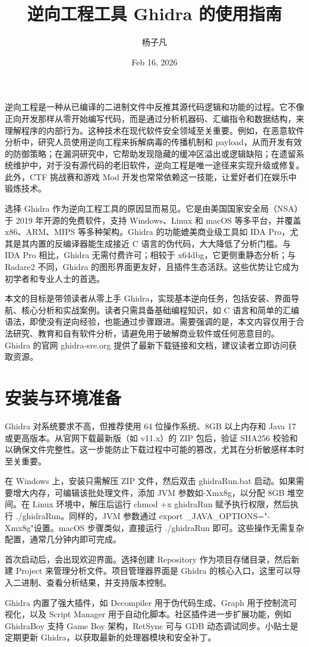 \title{逆向工程工具 Ghidra 的使用指南}
\author{杨子凡}
\date{Feb 16, 2026}
\maketitle
逆向工程是一种从已编译的二进制文件中反推其源代码逻辑和功能的过程。它不像正向开发那样从零开始编写代码，而是通过分析机器码、汇编指令和数据结构，来理解程序的内部行为。这种技术在现代软件安全领域至关重要。例如，在恶意软件分析中，研究人员使用逆向工程来拆解病毒的传播机制和 payload，从而开发有效的防御策略；在漏洞研究中，它帮助发现隐藏的缓冲区溢出或逻辑缺陷；在遗留系统维护中，对于没有源代码的老旧软件，逆向工程是唯一途径来实现升级或修复。此外，CTF 挑战赛和游戏 Mod 开发也常常依赖这一技能，让爱好者们在娱乐中锻炼技术。\par
选择 Ghidra 作为逆向工程工具的原因显而易见。它是由美国国家安全局（NSA）于 2019 年开源的免费软件，支持 Windows、Linux 和 macOS 等多平台，并覆盖 x86、ARM、MIPS 等多种架构。Ghidra 的功能媲美商业级工具如 IDA Pro，尤其是其内置的反编译器能生成接近 C 语言的伪代码，大大降低了分析门槛。与 IDA Pro 相比，Ghidra 无需付费许可；相较于 x64dbg，它更侧重静态分析；与 Radare2 不同，Ghidra 的图形界面更友好，且插件生态活跃。这些优势让它成为初学者和专业人士的首选。\par
本文的目标是带领读者从零上手 Ghidra，实现基本逆向任务，包括安装、界面导航、核心分析和实战案例。读者只需具备基础编程知识，如 C 语言和简单的汇编语法，即使没有逆向经验，也能通过步骤跟进。需要强调的是，本文内容仅用于合法研究、教育和自有软件分析，请避免用于破解商业软件或任何恶意目的。Ghidra 的官网 ghidra-sre.org 提供了最新下载链接和文档，建议读者立即访问获取资源。\par
\chapter{安装与环境准备}
Ghidra 对系统要求不高，但推荐使用 64 位操作系统、8GB 以上内存和 Java 17 或更高版本。从官网下载最新版（如 v11.x）的 ZIP 包后，验证 SHA256 校验和以确保文件完整性。这一步能防止下载过程中可能的篡改，尤其在分析敏感样本时至关重要。\par
在 Windows 上，安装只需解压 ZIP 文件，然后双击 ghidraRun.bat 启动。如果需要增大内存，可编辑该批处理文件，添加 JVM 参数如-Xmx8g，以分配 8GB 堆空间。在 Linux 环境中，解压后运行 chmod +x ghidraRun 赋予执行权限，然后执行 ./ghidraRun。同样的，JVM 参数通过 export \_{}JAVA\_{}OPTIONS="-Xmx8g"设置。macOS 步骤类似，直接运行 ./ghidraRun 即可。这些操作无需复杂配置，通常几分钟内即可完成。\par
首次启动后，会出现欢迎界面。选择创建 Repository 作为项目存储目录，然后新建 Project 来管理分析文件。项目管理器界面是 Ghidra 的核心入口，这里可以导入二进制、查看分析结果，并支持版本控制。\par
Ghidra 内置了强大插件，如 Decompiler 用于伪代码生成、Graph 用于控制流可视化，以及 Script Manager 用于自动化脚本。社区插件进一步扩展功能，例如 GhidraBoy 支持 Game Boy 架构，RetSync 可与 GDB 动态调试同步。小贴士是定期更新 Ghidra，以获取最新的处理器模块和安全补丁。\par
